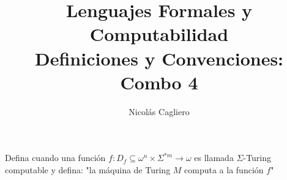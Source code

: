 \documentclass{article}
\title{Lenguajes Formales y Computabilidad \\
        \large Definiciones y Convenciones: Combo 4 }
\author{Nicolás Cagliero}
\begin{document}
\maketitle

Defina cuando una función $f : D_f \subseteq \omega^n \times \Sigma^{*m} 
\rightarrow \omega$
es llamada $\Sigma$-Turing computable y defina: "la máquina de Turing $M$
computa a la función $f$"
\end{document}
